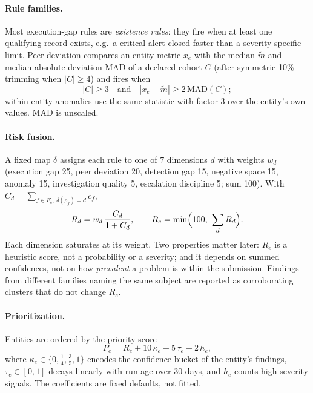 \paragraph{Rule families.} Most execution-gap rules are \emph{existence rules}: they
fire when at least one qualifying record exists, e.g.\ a critical alert closed faster
than a severity-specific limit. Peer deviation compares an entity metric $x_e$ with the
median $\tilde m$ and median absolute deviation $\mathrm{MAD}$ of a declared cohort
$C$ (after symmetric 10\% trimming when $|C|\ge 4$) and fires when
\begin{equation}
|C|\ge 3 \quad\text{and}\quad |x_e-\tilde m| \ge 2\,\mathrm{MAD}(C);
\label{eq:peer}
\end{equation}
within-entity anomalies use the same statistic with factor $3$ over the entity's own
values. MAD is unscaled.

\paragraph{Risk fusion.} A fixed map $\delta$ assigns each rule to one of
$7$ dimensions $d$ with weights $w_d$ (execution gap
25, peer deviation 20, detection gap
15, negative space 15, anomaly
15, investigation quality 5,
escalation discipline 5; sum 100). With
$C_d=\sum_{f\in F_e,\ \delta(\rho_f)=d} c_f$,
\begin{equation}
R_d = w_d\,\frac{C_d}{1+C_d},\qquad R_e=\min\Bigl(100,\ \sum_d R_d\Bigr).
\label{eq:risk}
\end{equation}
Each dimension saturates at its weight. Two properties matter later: $R_e$ is a
heuristic score, not a probability or a severity; and it depends on summed confidences,
not on how \emph{prevalent} a problem is within the submission. Findings from different
families naming the same subject are reported as corroborating clusters that do not
change $R_e$.

\paragraph{Prioritization.} Entities are ordered by the priority score
\begin{equation}
P_e = R_e + 10\,\kappa_e + 5\,\tau_e + 2\,h_e,
\label{eq:priority}
\end{equation}
where $\kappa_e\in\{0,\tfrac14,\tfrac35,1\}$ encodes the confidence bucket of the entity's
findings, $\tau_e\in[0,1]$ decays linearly with run age over 30 days, and $h_e$ counts
high-severity signals. The coefficients are fixed defaults, not fitted.

